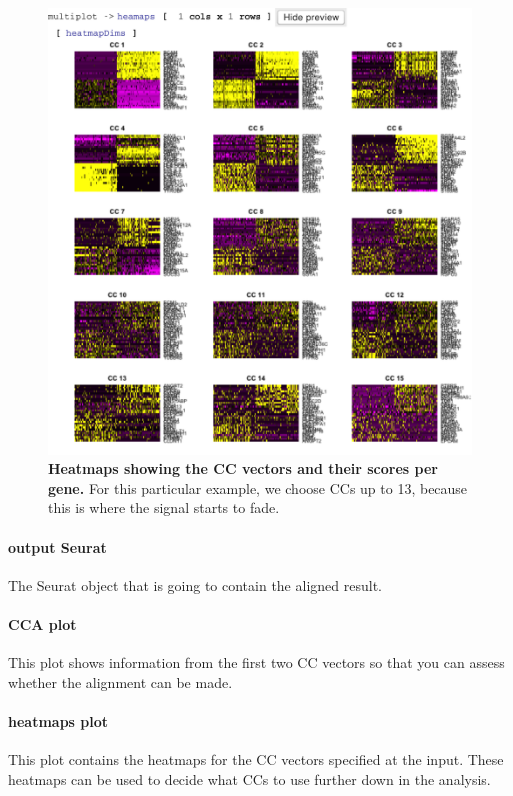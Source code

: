 \begin{figure}[h!tbp]
  \centering
    \includegraphics[width=\figWidthNarrow]{figures/HeatmapCCs.pdf}
    \caption[Heatmaps showing the CC vectors and their scores per gene.]{\textbf{Heatmaps showing
    the CC vectors and their scores per gene.} For this particular example, we choose CCs
    up to 13, because this is where the signal starts to fade.}
\label{fig:HeatmapxsCCs}
\end{figure}

\paragraph{output Seurat} The Seurat object that is going to contain the aligned result.

\paragraph{CCA plot} This plot shows information from the first two CC vectors so that
you can assess whether the alignment can be made.

\paragraph{heatmaps plot} This plot  contains the heatmaps for the CC vectors specified at
the input. These heatmaps can be used to decide what CCs to use further down in the analysis.

